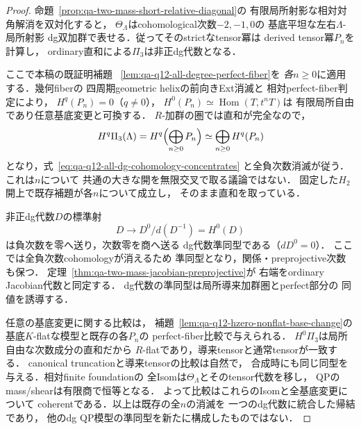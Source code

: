 \begin{proof}
命題~\ref{prop:qa-two-mass-short-relative-diagonal}の
有限局所射影な相対対角解消を双対化すると，
$\Theta_\Lambda$はcohomological次数$-2,-1,0$の
基底平坦な左右$\Lambda$-局所射影
dg双加群で表せる．従ってそのstrictなtensor冪は
derived tensor冪$P_n$を計算し，
ordinary直和による$\Pi_3$は非正dg代数となる．

ここで本稿の既証明補題
~\ref{lem:qa-q12-all-degree-perfect-fiber}を
\emph{各$n\ge0$}に適用する．幾何fiberの
四周期geometric helixの前向きExt消滅と
相対perfect-fiber判定により，
$H^q(P_n)=0$（$q\ne0$），
$H^0(P_n)\simeq\operatorname{Hom}(T,t^nT)$は
有限局所自由であり任意基底変更と可換する．
$R$-加群の圏では直和が完全なので，
\[
 H^q\Pi_3(\Lambda)
   =H^q\Bigl(\bigoplus_{n\ge0}P_n\Bigr)
   \simeq\bigoplus_{n\ge0}H^q(P_n)
\]
となり，式~\eqref{eq:qa-q12-all-dg-cohomology-concentrates}
と全負次数消滅が従う．これは$n$について
共通の大きな開を無限交叉で取る議論ではない．
固定した$H_2$開上で既存補題が各$n$について成立し，
そのまま直和を取っている．

非正dg代数$D$の標準射
\[
 D\longrightarrow D^0/d(D^{-1})=H^0(D)
\]
は負次数を零へ送り，次数零を商へ送る
dg代数準同型である（$dD^0=0$）．
ここでは全負次数cohomologyが消えるため
準同型となり，関係・preprojective次数も保つ．
定理~\ref{thm:qa-two-mass-jacobian-preprojective}が
右端をordinary Jacobian代数と同定する．
dg代数の準同型は局所導来加群圏とperfect部分の
同値を誘導する．

任意の基底変更に関する比較は，
補題~\ref{lem:qa-q12-hzero-nonflat-base-change}の
基底$K$-flatな模型と既存の各$P_n$の
perfect-fiber比較で与えられる．
$H^0\Pi_3$は局所自由な次数成分の直和だから
$R$-flatであり，導来tensorと通常tensorが一致する．
canonical truncationと導来tensorの比較は自然で，
合成時にも同じ同型を与える．相対finite foundationの
全Isomは$\Theta_\Lambda$とそのtensor代数を移し，
QPのmass/shearは有限商で恒等となる．
よって比較はこれらのIsomと全基底変更について
coherentである．以上は既存の全$n$の消滅を
一つのdg代数に統合した帰結であり，
他のdg QP模型の準同型を新たに構成したものではない．
\end{proof}

